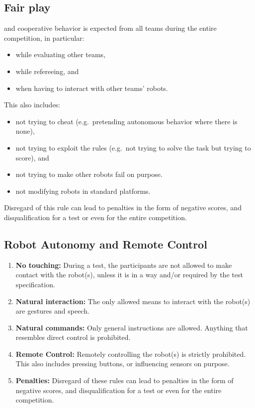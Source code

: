 \subsection{Fair play}
\label{rule:fairplay}
 and cooperative behavior is expected from all teams during the entire competition, in particular:
\begin{itemize}
	\item while evaluating other teams, 
	\item while refereeing, and 
	\item when having to interact with other teams' robots.  
\end{itemize}
This also includes:
\begin{itemize}
	\item not trying to cheat (e.g.~pretending autonomous behavior where there is none), 
	\item not trying to exploit the rules (e.g.~not trying to solve the task but trying to score), and 
	\item not trying to make other robots fail on purpose. 
	\item not modifying robots in standard platforms. 
\end{itemize}
Disregard of this rule can lead to penalties in the form of negative scores, and disqualification for a test or even for the entire competition. 

\subsection{Robot Autonomy and Remote Control}
\begin{enumerate}
	\item \textbf{No touching:} During a test, the participants are not allowed to make contact with the robot(s), unless it is in a  way and/or required by the test specification. 
	\item \textbf{Natural interaction:} The only allowed means to interact with the robot(s) are gestures and speech.
	\item \textbf{Natural commands:} Only general instructions are allowed. 
	Anything that resembles direct control is prohibited.
	\item \textbf{Remote Control:} Remotely controlling the robot(s) is strictly prohibited. This also includes pressing buttons, or influencing sensors on purpose.
	\item \textbf{Penalties:} Disregard of these rules can lead to penalties in the form of negative scores, and disqualification for a test or even for the entire competition. 
\end{enumerate}

